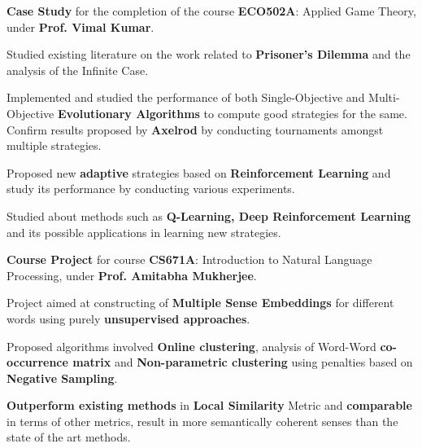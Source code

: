 \documentclass[a4paper]{norm-resume}
\begin{document}
	\vspace{2mm}

	\begin{tightitemize}
	\small
	{
	\item \textbf{Case Study} for the completion of the course \textbf{ECO502A}: Applied Game Theory, under \textbf{Prof. Vimal Kumar}.
	\item Studied existing literature on the work related to \textbf{Prisoner's Dilemma} and the analysis of the Infinite Case.
	\item Implemented and studied the performance of both Single-Objective and Multi-Objective \textbf{Evolutionary Algorithms} to compute good strategies for the same. Confirm results proposed by \textbf{Axelrod} by conducting tournaments amongst multiple strategies.
	\item Proposed new \textbf{adaptive} strategies based on \textbf{Reinforcement Learning} and study its performance by conducting various experiments.
	\item Studied about methods such as \textbf{Q-Learning, Deep Reinforcement Learning} and its possible applications in learning new strategies.
	}
	\end{tightitemize}

	\vspace{2mm}


					\descript{Aug '15 - Nov '15}	
	\begin{tightitemize}
	\small
	{
	\item \textbf{Course Project} for course \textbf{CS671A}: Introduction to Natural Language Processing, under \textbf{Prof. Amitabha Mukherjee}.
	\item Project aimed at constructing of \textbf{Multiple Sense Embeddings} for different words using purely \textbf{unsupervised approaches}.
	\item Proposed algorithms involved \textbf{Online clustering}, analysis of Word-Word \textbf{co-occurrence matrix} and \textbf{Non-parametric clustering} using penalties based on \textbf{Negative Sampling}.
	\item \textbf{Outperform existing methods} in \textbf{Local Similarity} Metric and \textbf{comparable} in terms of other metrics, result in more semantically coherent senses than the state of the art methods.
	}
	\end{tightitemize}
		
\end{document}
